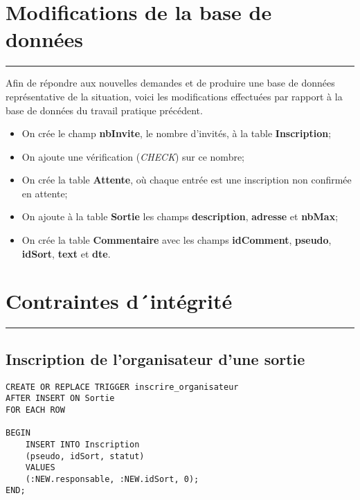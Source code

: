 \documentclass[11pt,letterpaper]{article}
\begin{document}
\section{Modifications de la base de données}
\hrule
\vspace{1em}
Afin de répondre aux nouvelles demandes et de produire une base de données représentative de la situation, 
voici les modifications effectuées par rapport à la base de données du travail pratique précédent.\\
\renewcommand{\labelitemi}{$\bullet$}
\begin{itemize}
  \item On crée le champ \textbf{nbInvite}, le nombre d’invités, à la table \textbf{Inscription};
  \item On ajoute une vérification (\textit{CHECK}) sur ce nombre;
  \item On crée la table \textbf{Attente}, où chaque entrée est une inscription non confirmée en attente;
  \item On ajoute à la table \textbf{Sortie} les champs \textbf{description}, \textbf{adresse} et \textbf{nbMax};
  \item On crée la table \textbf{Commentaire} avec les champs \textbf{idComment}, \textbf{pseudo}, \textbf{idSort}, \textbf{text} et \textbf{dte}.
\end{itemize}


\hfill
\section{Contraintes d´intégrité}
\hrule
\vspace{1em}

\subsection{Inscription de l’organisateur d’une sortie}
\begin{lstlisting}[style=sql, label={lst:p3}]
CREATE OR REPLACE TRIGGER inscrire_organisateur
AFTER INSERT ON Sortie
FOR EACH ROW

BEGIN
	INSERT INTO Inscription
	(pseudo, idSort, statut)
	VALUES
	(:NEW.responsable, :NEW.idSort, 0);
END;
\end{lstlisting}
\end{document}
